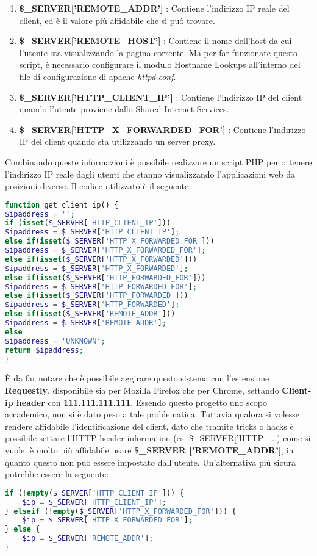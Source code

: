 \begin{enumerate}
\item \textbf{\$\_SERVER['REMOTE\_ADDR']} : Contiene l'indirizzo IP reale del client, ed è il valore più affidabile che si può trovare.
\item \textbf{\$\_SERVER['REMOTE\_HOST']} : Contiene il nome dell'host da cui l'utente sta visualizzando la pagina corrente. Ma per far funzionare questo script, è necessario configurare il modulo Hostname Lookups all'interno del file di configurazione di apache \textit{httpd.conf}.
\item \textbf{\$\_SERVER['HTTP\_CLIENT\_IP']} : Contiene l'indirizzo IP del client quando l'utente proviene dallo Shared Internet Services.
\item \textbf{\$\_SERVER['HTTP\_X\_FORWARDED\_FOR']} : Contiene l'indirizzo IP del client quando sta utilizzando un server proxy.
\end{enumerate}
Combinando queste informazioni è possibile realizzare un script PHP per ottenere l'indirizzo IP reale dagli utenti che stanno visualizzando l'applicazioni web da posizioni diverse. \cite{sito_get_ip}
Il codice utilizzato è il seguente: 
\begin{lstlisting}[language=PHP]
function get_client_ip() {
$ipaddress = '';
if (isset($_SERVER['HTTP_CLIENT_IP']))
$ipaddress = $_SERVER['HTTP_CLIENT_IP'];
else if(isset($_SERVER['HTTP_X_FORWARDED_FOR']))
$ipaddress = $_SERVER['HTTP_X_FORWARDED_FOR'];
else if(isset($_SERVER['HTTP_X_FORWARDED']))
$ipaddress = $_SERVER['HTTP_X_FORWARDED'];
else if(isset($_SERVER['HTTP_FORWARDED_FOR']))
$ipaddress = $_SERVER['HTTP_FORWARDED_FOR'];
else if(isset($_SERVER['HTTP_FORWARDED']))
$ipaddress = $_SERVER['HTTP_FORWARDED'];
else if(isset($_SERVER['REMOTE_ADDR']))
$ipaddress = $_SERVER['REMOTE_ADDR'];
else
$ipaddress = 'UNKNOWN';
return $ipaddress;
}
\end{lstlisting}
È da far notare che è possibile aggirare questo sistema con l'estensione \textbf{Requestly}, disponibile sia per Mozilla Firefox che per Chrome, settando \textbf{Client-ip header} con \textbf{111.111.111.111}. \newline
Essendo questo progetto uno scopo accademico, non si è dato peso a tale problematica. \newline Tuttavia qualora si volesse rendere affidabile l'identificazione del client, dato che tramite tricks o hacks è possibile settare l'HTTP header information (es. \$\_SERVER['HTTP\_...) come si vuole, è molto più affidabile usare \textbf{\$\_SERVER ['REMOTE\_ADDR']}, in quanto questo non può essere impostato dall'utente.
\newline
Un'alternativa più sicura potrebbe essere la seguente:
\begin{lstlisting}[language=PHP]
if (!empty($_SERVER['HTTP_CLIENT_IP'])) {
	$ip = $_SERVER['HTTP_CLIENT_IP'];
} elseif (!empty($_SERVER['HTTP_X_FORWARDED_FOR'])) {
	$ip = $_SERVER['HTTP_X_FORWARDED_FOR'];
} else {
	$ip = $_SERVER['REMOTE_ADDR'];
} 
\end{lstlisting}

